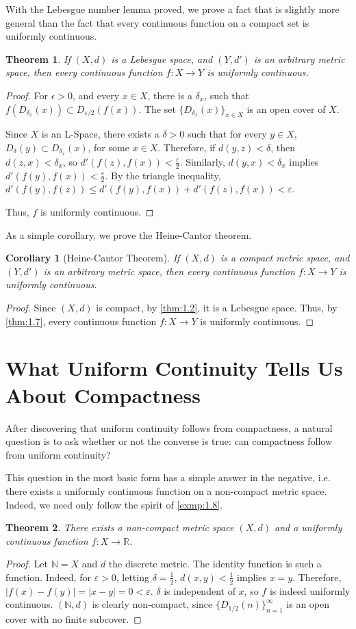 \documentclass[openany, amssymb, psamsfonts]{amsart}
\let\fullref\autoref
\newtheorem{thm}{Theorem}[section]
\newtheorem{cor}{Corollary}[section]
\theoremstyle{definition}
\numberwithin{equation}{section}
\begin{document}
With the Lebesgue number lemma proved, we prove a fact that is slightly more general than the fact that every continuous function on a compact set is uniformly continuous.
\begin{thm} \label{thm:1.7}
  If $(X,d)$ is a Lebesgue space, and $(Y,d')$ is an arbitrary metric space, then every continuous function $f: X \to Y$ is uniformly continuous.
\end{thm}
\begin{proof}
  For $\epsilon > 0$, and every $x \in X$, there is a $\delta_x$, such that $f(D_{\delta_x}(x))\subset D_{\varepsilon/2}(f(x))$. The set $\{D_{\delta_x}(x)\}_{x\in X}$ is an open cover of $X$. 

  Since $X$ is an L-Space, there exists a $\delta > 0$ such that for every $y \in X$, $D_\delta(y) \subset D_{\delta_x}(x)$, for some $x \in X$. Therefore, if $d(y,z) < \delta$, then $d(z,x) < \delta_x$, so $d'(f(z), f(x)) < \frac{\varepsilon}{2}$. Similarly, $d(y,x) < \delta_x$ implies $d'(f(y), f(x)) < \frac{\varepsilon}{2}$. By the triangle inequality, $d'(f(y),f(z)) \le d'(f(y), f(x)) + d'(f(z), f(x)) < \varepsilon$. 

  Thus, $f$ is uniformly continuous.
\end{proof}
As a simple corollary, we prove the Heine-Cantor theorem. 
\begin{cor}[Heine-Cantor Theorem]
If $(X,d)$ is a compact metric space, and $(Y,d')$ is an arbitrary metric space, then every continuous function $f: X \to Y$ is uniformly continuous.
\end{cor}
\begin{proof}
  Since $(X,d)$ is compact, by \fullref{thm:1.2}, it is a Lebesgue space. Thus, by \fullref{thm:1.7}, every continuous function $f:X \to Y$ is uniformly continuous.
\end{proof}
\section{What Uniform Continuity Tells Us About Compactness}
After discovering that uniform continuity follows from compactness, a natural question is to ask whether or not the converse is true: can compactness follow from uniform continuity?

This question in the most basic form has a simple answer in the negative, i.e. there exists a uniformly continuous function on a non-compact metric space. Indeed, we need only follow the spirit of \fullref{exmp:1.8}.
\begin{thm}\label{thm:2.1}
  There exists a non-compact metric space $(X,d)$ and a uniformly continuous function $f: X \to \mathbb R$. 
\end{thm}
\begin{proof}[Proof]
  Let $\mathbb N = X$ and $d$ the discrete metric. The identity function is such a function. Indeed, for $\varepsilon > 0$, letting $\delta  = \frac12$, $d(x,y) < \frac12$ implies $x = y$. Therefore, $|f(x) - f(y)| = |x-y| = 0 < \varepsilon$. $\delta$ is independent of $x$, so $f$ is indeed uniformly continuous. $(\mathbb N, d)$ is clearly non-compact, since $\{D_{1/2}(n)\}_{n=1}^\infty$ is an open cover with no finite subcover. 
\end{proof}
\end{document}
